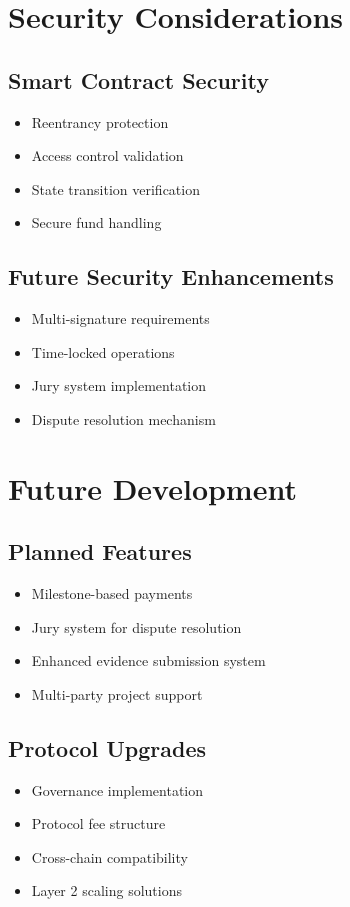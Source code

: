 \documentclass[12pt]{article}
\begin{document}
\section{Security Considerations}
\subsection{Smart Contract Security}
\begin{itemize}
    \item Reentrancy protection
    \item Access control validation
    \item State transition verification
    \item Secure fund handling
\end{itemize}

\subsection{Future Security Enhancements}
\begin{itemize}
    \item Multi-signature requirements
    \item Time-locked operations
    \item Jury system implementation
    \item Dispute resolution mechanism
\end{itemize}

\section{Future Development}
\subsection{Planned Features}
\begin{itemize}
    \item Milestone-based payments
    \item Jury system for dispute resolution
    \item Enhanced evidence submission system
    \item Multi-party project support
\end{itemize}

\subsection{Protocol Upgrades}
\begin{itemize}
    \item Governance implementation
    \item Protocol fee structure
    \item Cross-chain compatibility
    \item Layer 2 scaling solutions
\end{itemize}
\end{document}
